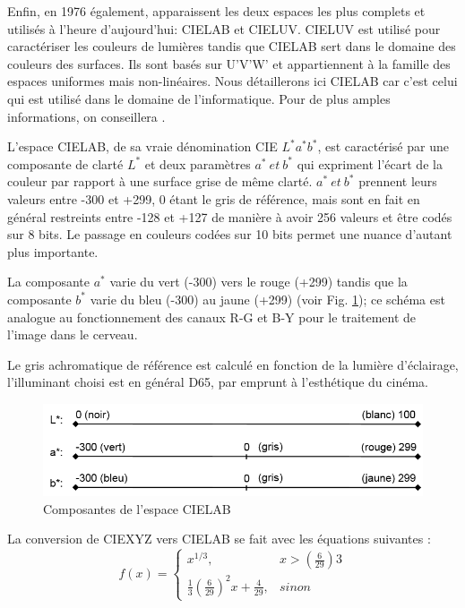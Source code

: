 	\par Enfin, en 1976 également, apparaissent les deux espaces les plus complets et utilisés à l'heure d'aujourd'hui: CIELAB et CIELUV. CIELUV est utilisé pour caractériser les couleurs de lumières tandis que CIELAB sert dans le domaine des couleurs des surfaces. Ils sont basés sur U'V'W' et appartiennent à la famille des espaces uniformes mais non-linéaires. Nous détaillerons ici CIELAB car c'est celui qui est utilisé dans le domaine de l'informatique. Pour de plus amples informations, on conseillera \citep{schanda_colorimetry:_2007}.
	
	\par L'espace CIELAB, de sa vraie dénomination CIE $L^\ast a^\ast b^\ast$, est caractérisé par une composante de clarté $L^\ast$ et deux paramètres $a^\ast~et~b^\ast$ qui expriment l'écart de la couleur par rapport à une surface grise de même clarté.
	$a^\ast~et~b^\ast$ prennent leurs valeurs entre -300 et +299, 0 étant le gris de référence, mais sont en fait en général restreints entre -128 et +127 de manière à avoir 256 valeurs et être codés sur 8 bits. Le passage en couleurs codées sur 10 bits permet une nuance d'autant plus importante.
	
	\par La composante $a^\ast$ varie du vert (-300) vers le rouge (+299) tandis que la composante $b^\ast$ varie du bleu (-300) au jaune (+299) (voir Fig. \ref{fig:cielab_axes}); ce schéma est analogue au fonctionnement des canaux R-G et B-Y pour le traitement de l'image dans le cerveau.
	
	\par Le gris achromatique de référence est calculé en fonction de la lumière d'éclairage, l'illuminant choisi est en général D65, par emprunt à l'esthétique du cinéma.
	
	\begin{figure}[h]
		\centering
		\includegraphics[scale=1]{Figures/CIELABAxes}
		\caption{Composantes de l'espace CIELAB}
		\label{fig:cielab_axes}
	\end{figure}
	
	\par La conversion de CIEXYZ vers CIELAB se fait avec les équations suivantes \citep{robertson_historical_1990}:
	\begin{equation}
		f(x)=  \begin{cases}
		x^{1/3}, & x>\left(\frac{6}{29}\right)3\\
		\frac{1}{3}\left(\frac{6}{29}\right)^2x + \frac{4}{29}, & sinon
		\end{cases}
		\label{eq:xyz_to_lab}
	\end{equation}
	
